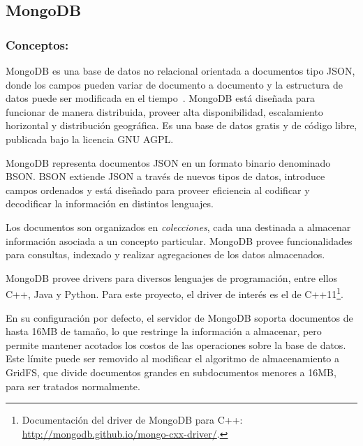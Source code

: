 \subsection{MongoDB}\label{sec:mongodb}

\subsubsection{Conceptos:}

MongoDB es una base de datos no relacional orientada a documentos tipo JSON, donde los campos pueden variar de documento a documento y la estructura de datos puede ser modificada en el tiempo~\cite{MongoDB}. MongoDB está diseñada para funcionar de manera distribuida, proveer alta disponibilidad, escalamiento horizontal y distribución geográfica. Es una base de datos gratis y de código libre, publicada bajo la licencia GNU AGPL.

MongoDB representa documentos JSON en un formato binario denominado BSON. BSON extiende JSON a través de nuevos tipos de datos, introduce campos ordenados y está diseñado para proveer eficiencia al codificar y decodificar la información en distintos lenguajes. 

Los documentos son organizados en \textit{colecciones}, cada una destinada a almacenar información asociada a un concepto particular. MongoDB provee funcionalidades para consultas, indexado y realizar agregaciones de los datos almacenados.

MongoDB provee drivers para diversos lenguajes de programación, entre ellos C++, Java y Python. Para este proyecto, el driver de interés es el de C++11\footnote{Documentación del driver de MongoDB para C++:  \url{http://mongodb.github.io/mongo-cxx-driver/}.}.

En su configuración por defecto, el servidor de MongoDB soporta documentos de hasta 16MB de tamaño, lo que restringe la información a almacenar, pero permite mantener acotados los costos de las operaciones sobre la base de datos. Este límite puede ser removido al modificar el algoritmo de almacenamiento a GridFS, que divide documentos grandes en subdocumentos menores a 16MB, para ser tratados normalmente.

